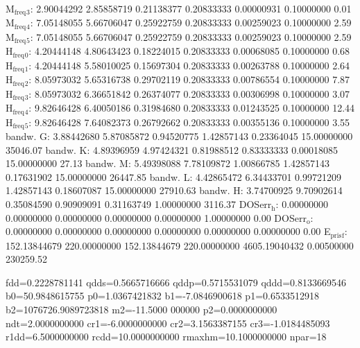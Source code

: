 \documentclass[11pt]{article}
\begin{document}
M\(_{\text{freq}}\)\(_{\text{3}}\):   2.90044292   2.85858719   0.21138377   0.20833333   0.00000931   0.10000000         0.01
M\(_{\text{freq}}\)\(_{\text{4}}\):   7.05148055   5.66706047   0.25922759   0.20833333   0.00259023   0.10000000         2.59
M\(_{\text{freq}}\)\(_{\text{5}}\):   7.05148055   5.66706047   0.25922759   0.20833333   0.00259023   0.10000000         2.59
H\(_{\text{freq}}\)\(_{\text{0}}\):   4.20444148   4.80643423   0.18224015   0.20833333   0.00068085   0.10000000         0.68
H\(_{\text{freq}}\)\(_{\text{1}}\):   4.20444148   5.58010025   0.15697304   0.20833333   0.00263788   0.10000000         2.64
H\(_{\text{freq}}\)\(_{\text{2}}\):   8.05973032   5.65316738   0.29702119   0.20833333   0.00786554   0.10000000         7.87
H\(_{\text{freq}}\)\(_{\text{3}}\):   8.05973032   6.36651842   0.26374077   0.20833333   0.00306998   0.10000000         3.07
H\(_{\text{freq}}\)\(_{\text{4}}\):   9.82646428   6.40050186   0.31984680   0.20833333   0.01243525   0.10000000        12.44
H\(_{\text{freq}}\)\(_{\text{5}}\):   9.82646428   7.64082373   0.26792662   0.20833333   0.00355136   0.10000000         3.55
bandw. G:   3.88442680   5.87085872   0.94520775   1.42857143   0.23364045  15.00000000     35046.07
bandw. K:   4.89396959   4.97424321   0.81988512   0.83333333   0.00018085  15.00000000        27.13
bandw. M:   5.49398088   7.78109872   1.00866785   1.42857143   0.17631902  15.00000000     26447.85
bandw. L:   4.42865472   6.34433701   0.99721209   1.42857143   0.18607087  15.00000000     27910.63
bandw. H:   3.74700925   9.70902614   0.35084590   0.90909091   0.31163749   1.00000000      3116.37
DOSerr\(_{\text{h}}\):   0.00000000   0.00000000   0.00000000   0.00000000   0.00000000   1.00000000         0.00
DOSerr\(_{\text{o}}\):   0.00000000   0.00000000   0.00000000   0.00000000   0.00000000   0.00000000         0.00
E\(_{\text{pris}}\)\(_{\text{f}}\): 152.13844679 220.00000000 152.13844679 220.00000000 4605.19040432   0.00500000    230259.52


  fdd=0.2228781141 qdds=0.5665716666 qddp=0.5715531079 qddd=0.8133669546 b0=50.9848615755 p0=1.0367421832 b1=-7.0846900618 p1=0.6533512918 b2=1076726.9089723818 m2=-11.5000
000000 p2=0.0000000000 ndt=2.0000000000 cr1=-6.0000000000 cr2=3.1563387155 cr3=-1.0184485093 r1dd=6.5000000000 rcdd=10.0000000000 rmaxhm=10.1000000000 npar=18 
\end{document}
